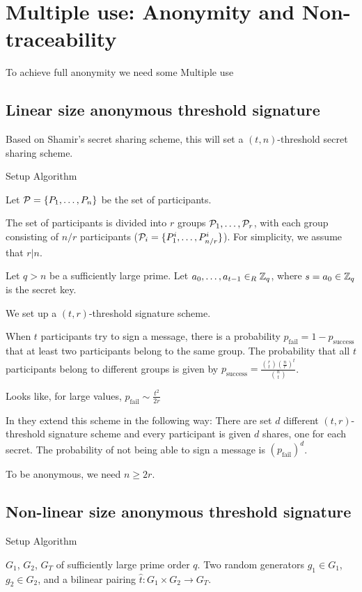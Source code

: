 \chapter{Multiple use: Anonymity and Non-traceability}
To achieve full anonymity we need some 
Multiple use 


\section{Linear size anonymous threshold signature}
\cite{DazaDSV09}

Based on Shamir's secret sharing scheme, this will set a $(t,n)$-threshold secret sharing scheme.

Setup Algorithm

Let ${\mathcal P} = \{P_1 , \dots , P_n \}$ be the set of participants.

The set of participants is divided into $r$ groups ${\mathcal P}_1, \dots , {\mathcal P}_r$, with each group consisting of $n/r$ participants (${\mathcal P}_i = \{P^i_1, \dots , P^i_{n/r}\}$). For simplicity, we assume that $r \vert n$.

Let $q > n$ be a sufficiently large prime. Let $a_0, \dots , a_{t-1} \in_R {\mathbb Z}_q$, where $s=a_0 \in {\mathbb Z}_q$ is the secret key.

We set up a $(t,r)$-threshold signature scheme.

When $t$ participants try to sign a message, there is a probability $p_{\text{fail}} = 1 - p_{\text{success}}$ that at least two participants belong to the same group. The probability that all $t$ participants belong to different groups is given by $p_{\text{success}} = \frac{\binom{r}{t} \left( \frac{n}{r} \right)^{t}}{\binom{n}{t}}$.

Looks like, for large values, $p_{\text{fail}} \sim \frac{t^2}{2r}$

In \cite{DazaDSV09} they extend this scheme in the following way: There are set $d$ different $(t,r)$-threshold signature scheme and every participant is given $d$ shares, one for each secret. The probability of not being able to sign a message is $\left(p_{\text{fail}} \right)^d$.

To be anonymous, we need $n \geq 2r$.

\section{Non-linear size anonymous threshold signature}
\cite{ChenNW11}
Setup Algorithm

$G_1$, $G_2$, $G_T$ of sufficiently large prime order $q$. Two random generators $g_1 \in G_1$, $g_2 \in G_2$, and a bilinear pairing $\hat{t}: G_1 \times G_2 \rightarrow G_T$.

